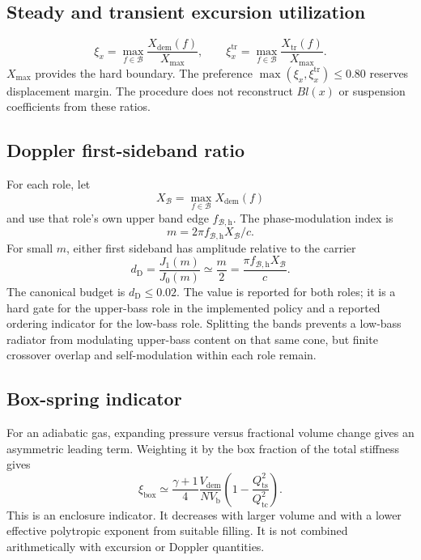 \documentclass[11pt,a4paper]{article}
\numberwithin{equation}{section}
\newcommand{\Xmax}{X_{\mathrm{max}}}
\newcommand{\Qts}{Q_{\mathrm{ts}}}
\newcommand{\Qtc}{Q_{\mathrm{tc}}}
\newcommand{\Vb}{V_{\mathrm{b}}}
\begin{document}
\subsection{Steady and transient excursion utilization}

\begin{equation}
	\xi_x=\max_{f\in\mathcal B}
	\frac{X_{\mathrm{dem}}(f)}{\Xmax},
	\qquad
	\xi_x^{\mathrm{tr}}=
	\max_{f\in\mathcal B}
	\frac{X_{\mathrm{tr}}(f)}{\Xmax}.
	\label{eq:xi}
\end{equation}
$\Xmax$ provides the hard boundary.  The preference
$\max(\xi_x,\xi_x^{\mathrm{tr}})\le0.80$ reserves displacement margin.
The procedure does not reconstruct $Bl(x)$ or suspension coefficients from
these ratios.

\subsection{Doppler first-sideband ratio}

For each role, let
\begin{equation}
	X_{\mathcal B}=
	\max_{f\in\mathcal B}X_{\mathrm{dem}}(f)
	\label{eq:Xband}
\end{equation}
and use that role's own upper band edge $f_{\mathcal B,\mathrm h}$.  The
phase-modulation index is
\begin{equation}
	m=2\pi f_{\mathcal B,\mathrm h}X_{\mathcal B}/c.
	\label{eq:doppler-m}
\end{equation}
For small $m$, either first sideband has amplitude relative to the carrier
\begin{equation}
	\boxed{
	d_{\mathrm D}=\frac{J_1(m)}{J_0(m)}
	\simeq\frac{m}{2}
	=\frac{\pi f_{\mathcal B,\mathrm h}X_{\mathcal B}}{c}.}
	\label{eq:doppler}
\end{equation}
The canonical budget is $d_{\mathrm D}\le0.02$.  The value is reported for
both roles; it is a hard gate for the upper-bass role in the implemented
policy and a reported ordering indicator for the low-bass role.  Splitting
the bands prevents a low-bass radiator from modulating upper-bass content on
that same cone, but finite crossover overlap and self-modulation within each
role remain.

\subsection{Box-spring indicator}

For an adiabatic gas, expanding pressure versus fractional volume change
gives an asymmetric leading term.  Weighting it by the box fraction of the
total stiffness gives
\begin{equation}
	\boxed{
	\xi_{\mathrm{box}}\simeq
	\frac{\gamma+1}{4}
	\frac{V_{\mathrm{dem}}}{N\Vb}
	\left(1-\frac{\Qts^2}{\Qtc^2}\right).}
	\label{eq:boxHD}
\end{equation}
This is an enclosure indicator.  It decreases with larger volume and with a
lower effective polytropic exponent from suitable filling.  It is not
combined arithmetically with excursion or Doppler quantities.
\end{document}
